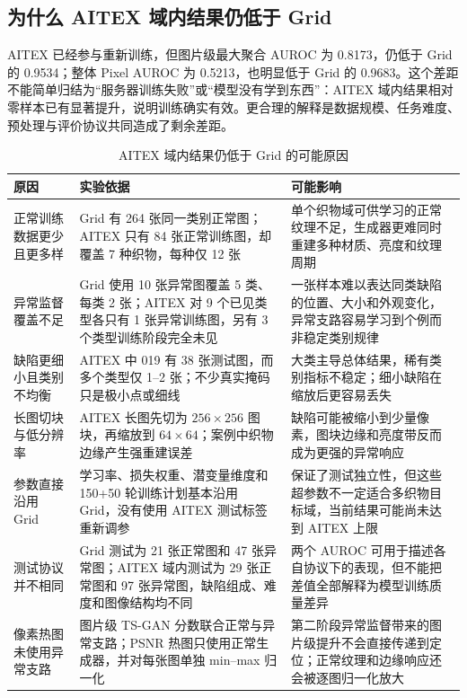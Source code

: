\documentclass[UTF8,12pt]{ctexart}
\begin{document}
\subsection{为什么 AITEX 域内结果仍低于 Grid}

AITEX 已经参与重新训练，但图片级最大聚合 AUROC 为 0.8173，仍低于 Grid 的 0.9534；整体 Pixel AUROC 为 0.5213，也明显低于 Grid 的 0.9683。这个差距不能简单归结为“服务器训练失败”或“模型没有学到东西”：AITEX 域内结果相对零样本已有显著提升，说明训练确实有效。更合理的解释是数据规模、任务难度、预处理与评价协议共同造成了剩余差距。

\begin{table}[H]
\centering
\caption{AITEX 域内结果仍低于 Grid 的可能原因}
\small
\begin{tabularx}{\linewidth}{L{3.0cm}Y Y}
\toprule
\textbf{原因} & \textbf{实验依据} & \textbf{可能影响} \\
\midrule
正常训练数据更少且更多样 & Grid 有 264 张同一类别正常图；AITEX 只有 84 张正常训练图，却覆盖 7 种织物，每种仅 12 张 & 单个织物域可供学习的正常纹理不足，生成器更难同时重建多种材质、亮度和纹理周期 \\
异常监督覆盖不足 & Grid 使用 10 张异常图覆盖 5 类、每类 2 张；AITEX 对 9 个已见类型各只有 1 张异常训练图，另有 3 个类型训练阶段完全未见 & 一张样本难以表达同类缺陷的位置、大小和外观变化，异常支路容易学习到个例而非稳定类别规律 \\
缺陷更细小且类别不均衡 & AITEX 中 019 有 38 张测试图，而多个类型仅 1--2 张；不少真实掩码只是极小点或细线 & 大类主导总体结果，稀有类别指标不稳定；细小缺陷在缩放后更容易丢失 \\
长图切块与低分辨率 & AITEX 长图先切为 $256\times256$ 图块，再缩放到 $64\times64$；案例中织物边缘产生强重建误差 & 缺陷可能被缩小到少量像素，图块边缘和亮度带反而成为更强的异常响应 \\
参数直接沿用 Grid & 学习率、损失权重、潜变量维度和 150+50 轮训练计划基本沿用 Grid，没有使用 AITEX 测试标签重新调参 & 保证了测试独立性，但这些超参数不一定适合多织物目标域，当前结果可能尚未达到 AITEX 上限 \\
测试协议并不相同 & Grid 测试为 21 张正常图和 47 张异常图；AITEX 域内测试为 29 张正常图和 97 张异常图，缺陷组成、难度和图像结构均不同 & 两个 AUROC 可用于描述各自协议下的表现，但不能把差值全部解释为模型训练质量差异 \\
像素热图未使用异常支路 & 图片级 TS-GAN 分数联合正常与异常支路；PSNR 热图只使用正常生成器，并对每张图单独 min--max 归一化 & 第二阶段异常监督带来的图片级提升不会直接传递到定位；正常纹理和边缘响应还会被逐图归一化放大 \\
\bottomrule
\end{tabularx}
\end{table}
\end{document}
